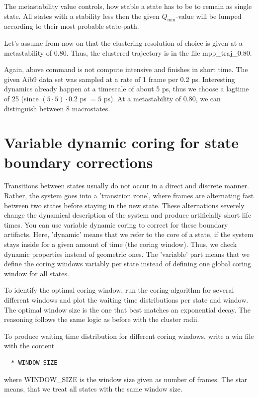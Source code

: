 \documentclass[12pt,a4paper,twoside,english,fleqn]{article}
\begin{document}
The metastability value controls, how stable a state has to be to remain as
single state. All states with a stability less then the given
$Q_\text{min}$-value will be lumped according to their most probable state-path.

Let's assume from now on that the clustering resolution of choice is given at
a metastability of 0.80. Thus, the clustered trajectory is in the file
mpp\_traj\_0.80.


\begin{mdframed}[innertopmargin=20pt]
  Again, above command is not compute intensive and finishes in short time.
  The given Aib9 data set was sampled at a rate of 1 frame per 0.2 ps.
  Interesting dynamics already happen at a timescale of about 5 ps, thus we
  choose a lagtime of 25 (since $\left(5 \cdot 5\right) \cdot 0.2$ ps $ = 5$ ps).
  At a metastability of 0.80, we can distinguish between 8 macrostates.
\end{mdframed}





\section{Variable dynamic coring for state boundary corrections}
Transitions between states usually do not occur in a direct and discrete manner.
Rather, the system goes into a 'transition zone', where frames are alternating
fast between two states before staying in the new state.
These alternations severely change the dynamical description of the system and
produce artificially short life times.
You can use variable dynamic coring to correct for these boundary artifacts.
Here, 'dynamic' means that we refer to the core of a state, if the system stays
inside for a given amount of time (the coring window). Thus, we check dynamic
properties instead of geometric ones. The 'variable' part means that we define
the coring windows variably per state instead of defining one global coring
window for all states.

To identify the optimal coring window, run the coring-algorithm for several
different windows and plot the waiting time distributions per state and window.
The optimal window size is the one that best matches an exponential decay.
The reasoning follows the same logic as before with the cluster radii.

To produce waiting time distribution for different coring windows, write a
{\ttfamily win} file with the content
\begin{lstlisting}
  * WINDOW_SIZE
\end{lstlisting}
where {\ttfamily WINDOW\_SIZE} is the window size given as number of frames.
The star means, that we treat all states with the same window size.
\end{document}
